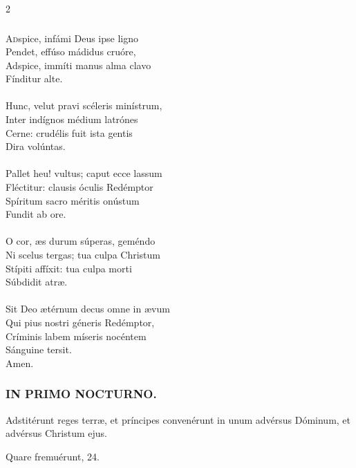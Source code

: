 \documentclass[9pt,twoside]{extarticle}
\begin{document}
\begin{multicols}{2}
\subsubsection*{\center{}}
\lettrine{A}dspice, infámi Deus ipse ligno\\
Pendet, effúso mádidus cruóre,\\
Adspice, immíti manus alma clavo\\
Fínditur alte.\\
\\
Hunc, velut pravi scéleris minístrum,\\
Inter indígnos médium latrónes\\
Cerne: crudélis fuit ista gentis\\
Dira volúntas.\\
\\
Pallet heu! vultus; caput ecce lassum\\
Fléctitur: clausis óculis Redémptor\\
Spíritum sacro méritis onústum\\
Fundit ab ore.\\
\\
O cor, æs durum súperas, geméndo\\
Ni scelus tergas; tua culpa Christum\\
Stípiti affíxit: tua culpa morti\\
Súbdidit atræ.\\
\\
Sit Deo ætérnum decus omne in ævum\\
Qui pius nostri géneris Redémptor,\\
Críminis labem míseris nocéntem\\
Sánguine tersit.\\
Amen.

\subsubsection*{\center \textsc{IN PRIMO NOCTURNO.}}
\begin{tightlist}{}
\item {} Adstitérunt reges terræ, et príncipes convenérunt in unum advérsus Dóminum, et advérsus Christum ejus.
\item {} Quare fremuérunt, 24.
\end{tightlist}


\end{multicols}
\end{document}
